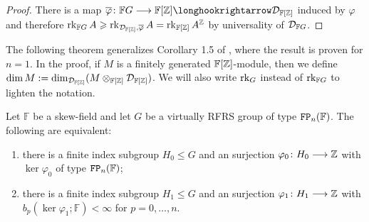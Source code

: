 \documentclass[11pt, letterpaper]{amsart}
\begin{document}
\begin{proof}
    There is a map $\overline{\varphi} \colon \mathbb F G \longrightarrow \mathbb F[\Z] \longhookrightarrow \DF{[\Z]}$ induced by $\varphi$ and therefore $\operatorname{rk}_{\mathbb FG} A \geqslant \operatorname{rk}_{\mathcal{D}_{\mathbb F{[\mathbb{Z}]}}, \overline{\varphi}} A = \operatorname{rk}_{\mathbb F[\mathbb{Z}]} A^{\mathbb{Z}}$ by universality of $\mathcal{D}_{\mathbb F{G}}$. \qedhere
\end{proof}

The following theorem generalizes Corollary 1.5 of \cite{JaikinZapirain2020THEUO}, where the result is proven for $n = 1$. In the proof, if $M$ is a finitely generated $\mathbb F[\mathbb{Z}]$-module, then we define $\dim M := \dim_{\mathcal{D}_{\mathbb F{[\mathbb{Z}]}}} (M \otimes_{\mathbb F[\mathbb{Z}]} \mathcal{D}_{\mathbb F{[\mathbb{Z}]}})$. We will also write $\operatorname{rk}_G$ instead of $\operatorname{rk}_{\mathbb FG}$ to lighten the notation.

\begin{thm}\label{thm:finiteBetti}
    Let $\mathbb F$ be a skew-field and let $G$ be a virtually RFRS group of type $\mathtt{FP}_n(\mathbb F)$. The following are equivalent:
    \begin{enumerate}[label=(\arabic*)]
        \item\label{item:FP} there is a finite index subgroup $H_0 \leqslant G$ and an surjection $\varphi_0 \colon H_0 \longrightarrow \mathbb{Z}$ with $\ker \varphi_0$ of type $\mathtt{FP}_n(\mathbb F)$;
        \item\label{item:Betti} there is a finite index subgroup $H_1 \leqslant G$ and an surjection $\varphi_1 \colon H_1 \longrightarrow \mathbb{Z}$ with $b_p(\ker \varphi_1; \mathbb F) < \infty$ for $p = 0, \dots, n$.
    \end{enumerate}
\end{thm}
\end{document}

